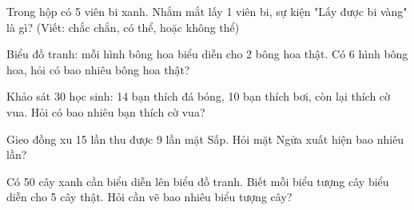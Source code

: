 \begin{ex} %
Trong hộp có 5 viên bi xanh. Nhắm mắt lấy 1 viên bi, sự kiện "Lấy được bi vàng" là gì? (Viết: chắc chắn, có thể, hoặc không thể)
\end{ex}

\begin{ex} %
Biểu đồ tranh: mỗi hình bông hoa biểu diễn cho 2 bông hoa thật. Có 6 hình bông hoa, hỏi có bao nhiêu bông hoa thật?
\end{ex}

\begin{ex} %
Khảo sát 30 học sinh: 14 bạn thích đá bóng, 10 bạn thích bơi, còn lại thích cờ vua. Hỏi có bao nhiêu bạn thích cờ vua?
\end{ex}

\begin{ex} %
Gieo đồng xu 15 lần thu được 9 lần mặt Sấp. Hỏi mặt Ngửa xuất hiện bao nhiêu lần?
\end{ex}

\begin{ex} %
Có 50 cây xanh cần biểu diễn lên biểu đồ tranh. Biết mỗi biểu tượng cây biểu diễn cho 5 cây thật. Hỏi cần vẽ bao nhiêu biểu tượng cây?
\end{ex}
